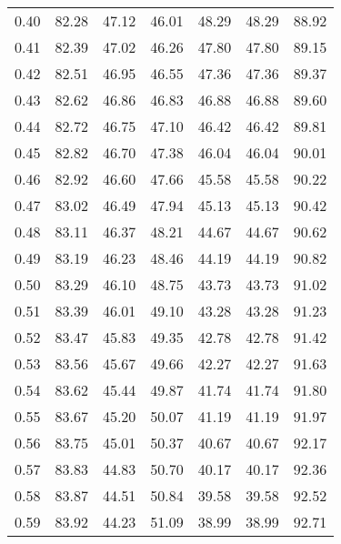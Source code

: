 \begin{tabular}{|c|c|c|c|c|c|c|}
      0.40 &     82.28 &     47.12 &      46.01 &   48.29 &      48.29 &         88.92 \\
      0.41 &     82.39 &     47.02 &      46.26 &   47.80 &      47.80 &         89.15 \\
      0.42 &     82.51 &     46.95 &      46.55 &   47.36 &      47.36 &         89.37 \\
      0.43 &     82.62 &     46.86 &      46.83 &   46.88 &      46.88 &         89.60 \\
      0.44 &     82.72 &     46.75 &      47.10 &   46.42 &      46.42 &         89.81 \\
      0.45 &     82.82 &     46.70 &      47.38 &   46.04 &      46.04 &         90.01 \\
      0.46 &     82.92 &     46.60 &      47.66 &   45.58 &      45.58 &         90.22 \\
      0.47 &     83.02 &     46.49 &      47.94 &   45.13 &      45.13 &         90.42 \\
      0.48 &     83.11 &     46.37 &      48.21 &   44.67 &      44.67 &         90.62 \\
      0.49 &     83.19 &     46.23 &      48.46 &   44.19 &      44.19 &         90.82 \\
      0.50 &     83.29 &     46.10 &      48.75 &   43.73 &      43.73 &         91.02 \\
      0.51 &     83.39 &     46.01 &      49.10 &   43.28 &      43.28 &         91.23 \\
      0.52 &     83.47 &     45.83 &      49.35 &   42.78 &      42.78 &         91.42 \\
      0.53 &     83.56 &     45.67 &      49.66 &   42.27 &      42.27 &         91.63 \\
      0.54 &     83.62 &     45.44 &      49.87 &   41.74 &      41.74 &         91.80 \\
      0.55 &     83.67 &     45.20 &      50.07 &   41.19 &      41.19 &         91.97 \\
      0.56 &     83.75 &     45.01 &      50.37 &   40.67 &      40.67 &         92.17 \\
      0.57 &     83.83 &     44.83 &      50.70 &   40.17 &      40.17 &         92.36 \\
      0.58 &     83.87 &     44.51 &      50.84 &   39.58 &      39.58 &         92.52 \\
      0.59 &     83.92 &     44.23 &      51.09 &   38.99 &      38.99 &         92.71 \\

\end{tabular}
